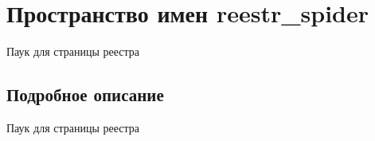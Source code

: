 \hypertarget{namespacereestr__spider}{}\section{Пространство имен reestr\+\_\+spider}
\label{namespacereestr__spider}


Паук для страницы реестра  




\subsection{Подробное описание}
Паук для страницы реестра 